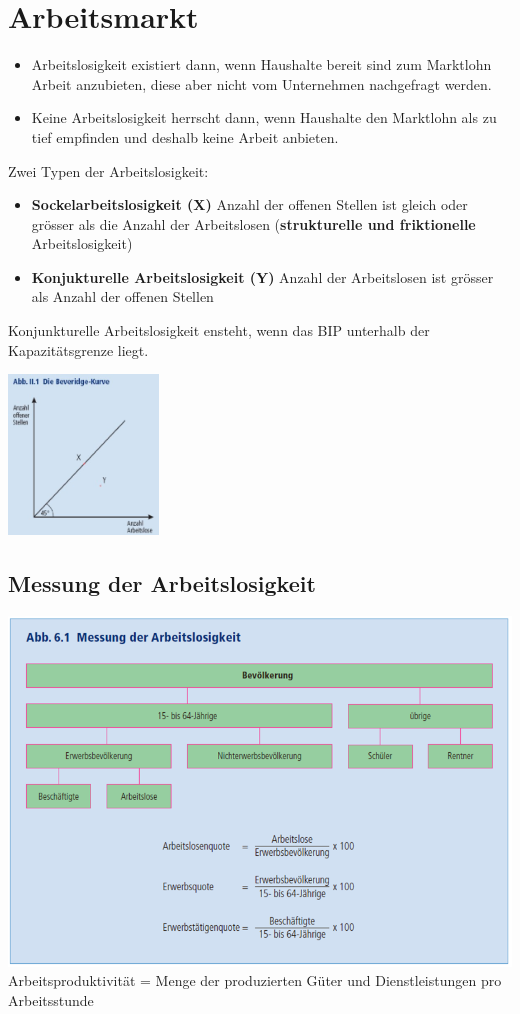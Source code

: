\section{Arbeitsmarkt}
\begin{itemize}
	\item Arbeitslosigkeit existiert dann, wenn Haushalte bereit sind zum Marktlohn Arbeit anzubieten, diese aber nicht vom Unternehmen nachgefragt werden.
	\item Keine Arbeitslosigkeit herrscht dann, wenn Haushalte den Marktlohn als zu tief empfinden und deshalb keine Arbeit anbieten.
\end{itemize}

\begin{minipage}{12cm}
    Zwei Typen der Arbeitslosigkeit:
	\begin{itemize}
		\item \textbf{Sockelarbeitslosigkeit (X)}\newline
		 Anzahl der offenen Stellen ist gleich oder grösser als die Anzahl der Arbeitslosen (\textbf{strukturelle und friktionelle} Arbeitslosigkeit)
		\item \textbf{Konjukturelle Arbeitslosigkeit (Y)}\newline
		Anzahl der Arbeitslosen ist grösser als Anzahl der offenen Stellen
	\end{itemize}
\vspace{0.5cm}
Konjunkturelle Arbeitslosigkeit ensteht, wenn das BIP unterhalb der Kapazitätsgrenze liegt.
\end{minipage}
\begin{minipage}{5cm}
	\includegraphics[width=4cm]{images/beveridge.jpg}
\end{minipage}
\subsection{Messung der Arbeitslosigkeit}
\includegraphics[width=0.8\linewidth]{images/messung.png}\\
Arbeitsproduktivität = Menge der produzierten Güter und Dienstleistungen pro Arbeitsstunde
